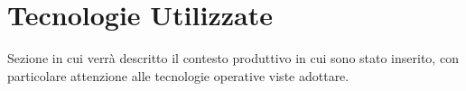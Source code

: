 \section{Tecnologie Utilizzate}

Sezione in cui verrà descritto il contesto produttivo in cui sono stato inserito, con particolare attenzione alle tecnologie operative viste adottare.